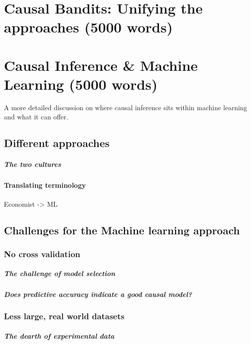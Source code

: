\documentclass[11pt,a4paper]{book}
\begin{document}
\chapter*{Causal Bandits: Unifying the approaches (5000 words)}



\chapter*{Causal Inference \& Machine Learning (5000 words)}
A more detailed discussion on where causal inference sits within machine learning and what it can offer.



\section*{Different approaches}
\paragraph{The two cultures}


\subsubsection*{Translating terminology}
Economist -> ML

\section*{Challenges for the Machine learning approach}
\subsection*{No cross validation}
\paragraph*{The challenge of model selection}
\paragraph*{Does predictive accuracy indicate a good causal model?}
\subsection*{Less large, real world datasets}
\paragraph*{The dearth of experimental data}
\end{document}
